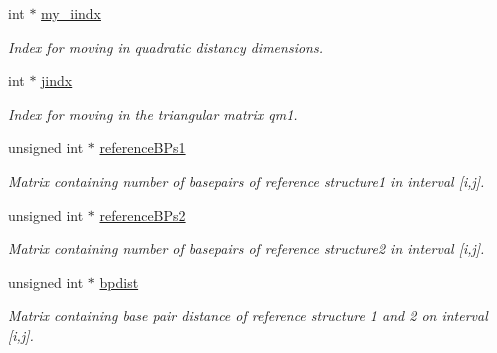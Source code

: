 \begin{DoxyCompactItemize}
\mbox{\label{structTwoDpfold__vars_ac2d3e6abf0cb0e1df363904fc938076e}} 
int $\ast$ \mbox{\hyperlink{structTwoDpfold__vars_ac2d3e6abf0cb0e1df363904fc938076e}{my\+\_\+iindx}}
\begin{DoxyCompactList}\small\item\em Index for moving in quadratic distancy dimensions. \end{DoxyCompactList}\item 
\mbox{\label{structTwoDpfold__vars_a0699e194a797532c91b284ab10272384}} 
int $\ast$ \mbox{\hyperlink{structTwoDpfold__vars_a0699e194a797532c91b284ab10272384}{jindx}}
\begin{DoxyCompactList}\small\item\em Index for moving in the triangular matrix qm1. \end{DoxyCompactList}\item 
\mbox{\label{structTwoDpfold__vars_aea15706d27b6b0fc19f5773919f43a8a}} 
unsigned int $\ast$ \mbox{\hyperlink{structTwoDpfold__vars_aea15706d27b6b0fc19f5773919f43a8a}{reference\+B\+Ps1}}
\begin{DoxyCompactList}\small\item\em Matrix containing number of basepairs of reference structure1 in interval \mbox{[}i,j\mbox{]}. \end{DoxyCompactList}\item 
\mbox{\label{structTwoDpfold__vars_a1221396d712bf76b7f35297f2ab35a9f}} 
unsigned int $\ast$ \mbox{\hyperlink{structTwoDpfold__vars_a1221396d712bf76b7f35297f2ab35a9f}{reference\+B\+Ps2}}
\begin{DoxyCompactList}\small\item\em Matrix containing number of basepairs of reference structure2 in interval \mbox{[}i,j\mbox{]}. \end{DoxyCompactList}\item 
\mbox{\label{structTwoDpfold__vars_accef8eaa05fa57ca33aa22cbc7b7aaff}} 
unsigned int $\ast$ \mbox{\hyperlink{structTwoDpfold__vars_accef8eaa05fa57ca33aa22cbc7b7aaff}{bpdist}}
\begin{DoxyCompactList}\small\item\em Matrix containing base pair distance of reference structure 1 and 2 on interval \mbox{[}i,j\mbox{]}. \end{DoxyCompactList}\item 

\end{DoxyCompactItemize}
